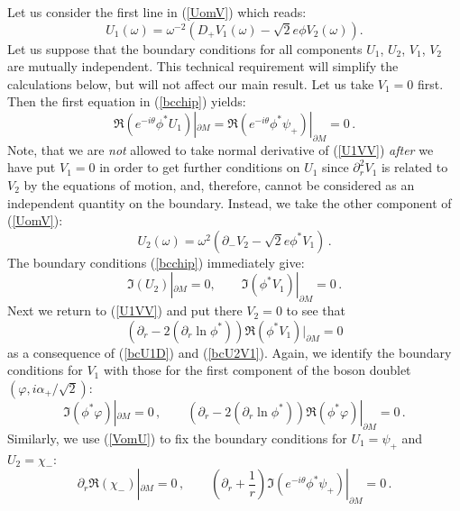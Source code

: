 \documentclass[a4paper,12pt]{article}
\begin{document}
Let us consider the first line in (\ref{UomV}) which reads:
\begin{equation}
U_1(\omega ) =\omega^{-2} \left( D_+ V_1(\omega ) 
                              -\sqrt{2} e \phi V_2(\omega ) \right).
\label{U1VV}
\end{equation}
Let us suppose that the boundary conditions for all components
$U_1$, $U_2$, $V_1$, $V_2$ are mutually independent. This technical
requirement will simplify the calculations below, but will not affect
our main result. Let us take $V_1=0$ first. Then the first equation
in (\ref{bcchip}) yields:
\begin{equation}
\Re \left( e^{-i\theta}\phi^* U_1 \right)|_{\partial M}=
\Re \left( e^{-i\theta}\phi^* \psi_+ \right)|_{\partial M}=
0\,.\label{bcU1D}
\end{equation}
Note, that we are {\it not} allowed to take normal derivative of
(\ref{U1VV}) {\it after} we have put $V_1=0$ in order to get further
conditions on $U_1$ since $\partial_r^2 V_1$ is related to
$V_2$ by the equations of motion, and, therefore, cannot be
considered as an independent quantity on the boundary.
Instead, we take the other component of (\ref{UomV}):
\begin{equation}
U_2(\omega )=\omega^2 \left( \partial_- V_2 
                            -\sqrt{2} e\phi^* V_1 \right)\,.
\label{U2VV}
\end{equation}
The boundary conditions (\ref{bcchip}) immediately give:
\begin{equation}
\Im \left( U_2 \right)|_{\partial M}=0,\qquad
\Im \left( \phi^* V_1 \right)|_{\partial M}=0 \,.
\label{bcU2V1}
\end{equation}
Next we return to (\ref{U1VV}) and put there $V_2=0$ to
see that
\begin{equation}
\left( \partial_r -2(\partial_r \ln \phi^* ) \right)\Re 
\left( \phi^* V_1 \right)|_{\partial M}=0  \label{bcV1N}
\end{equation}
as a consequence of (\ref{bcU1D}) and (\ref{bcU2V1}). Again, we identify 
the boundary conditions for $V_1$ with those for the first component
of the boson doublet $(\varphi ,i\alpha_+/\sqrt{2})$:
\begin{equation}
\Im \left( \phi^* \varphi \right)|_{\partial M}=0 \,,\qquad
\left( \partial_r -2(\partial_r \ln \phi^* ) \right)\Re 
\left( \phi^* \varphi \right)|_{\partial M}=0 \,.\label{bcphi}
\end{equation}
Similarly, we use (\ref{VomU}) to fix the boundary conditions for
$U_1=\psi_+$ and $U_2=\chi_-$:
\begin{equation}
\partial_r \Re (\chi_-)|_{\partial M}=0\,,\qquad
\left( \partial_r +\frac 1r \right) 
\Im \left( e^{-i\theta} \phi^* \psi_+ \right)|_{\partial M}=0\,.
\label{bcUUN}
\end{equation}
\end{document}
